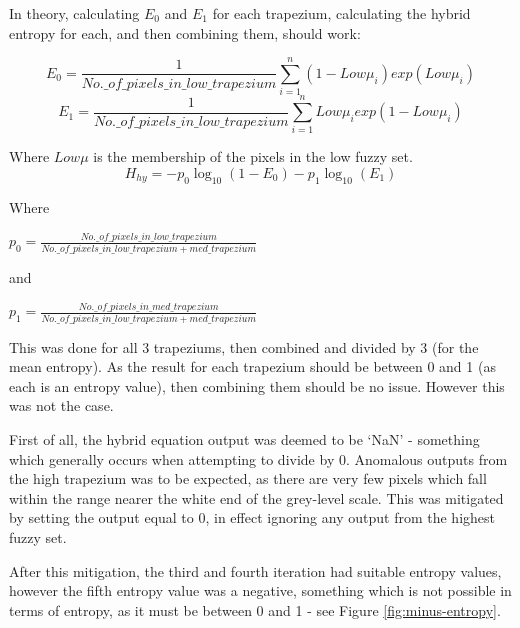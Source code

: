 In theory, calculating $E_0$ and $E_1$ for each trapezium, calculating the hybrid entropy for each, and then combining them, should work:

\begin{equation}
E_0 = \frac{1}{No.\_of\_pixels\_in\_low\_trapezium}\displaystyle\sum_{i=1}^{n}{(1-Low\mu_i)exp(Low\mu_i)}
\end{equation}
\begin{equation}
E_1 = \frac{1}{No.\_of\_pixels\_in\_low\_trapezium}\displaystyle\sum_{i=1}^{n}{Low\mu_iexp(1-Low\mu_i)}
\end{equation}

Where $Low\mu$ is the membership of the pixels in the low fuzzy set.
\begin{equation}
H_{hy} = -p_0\log_{10}(1 - E_0) - p_1\log_{10}(E_1)
\end{equation}

Where

$p_0 = \frac{No.\_of\_pixels\_in\_low\_trapezium}{No.\_of\_pixels\_in\_low\_trapezium + med\_trapezium}$

and

$p_1 = \frac{No.\_of\_pixels\_in\_med\_trapezium}{No.\_of\_pixels\_in\_low\_trapezium + med\_trapezium}$


This was done for all 3 trapeziums, then combined and divided by 3 (for the mean entropy). As the result for each trapezium should be between 0 and 1 (as each is an entropy value), then combining them should be no issue. However this was not the case.

First of all, the hybrid equation output was deemed to be `NaN' - something which generally occurs when attempting to divide by 0. Anomalous outputs from the high trapezium was to be expected, as there are very few pixels which fall within the range nearer the white end of the grey-level scale. This was mitigated by setting the output equal to 0, in effect ignoring any output from the highest fuzzy set.

After this mitigation, the third and fourth iteration had suitable entropy values, however the fifth entropy value was a negative, something which is not possible in terms of entropy, as it must be between 0 and 1 - see Figure \ref{fig:minus-entropy}.

